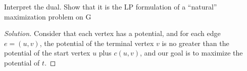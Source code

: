     \begin{thm}{}{}
        Interpret the dual. Show that it is the LP formulation of a ``natural'' maximization problem on G
    \end{thm}

    \begin{proof}[Solution]
        Consider that each vertex has a potential, and for each edge $e=(u,v)$, 
        the potential of the terminal vertex $v$ is no greater than the potential of the start vertex $u$ plus $c(u, v)$, 
        and our goal is to maximize the potential of $t$. 
    \end{proof}

